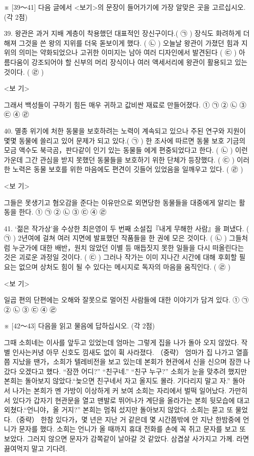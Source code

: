 \documentclass[12pt]{article}
\begin{document}
\begin{enumerate}[1.]
※ [39～41] 다음 글에서 <보기>의 문장이 들어가기에 가장 알맞은 곳을 고르십시오. (각 2점)

39.
  왕관은 과거 지배 계층이 착용했던 대표적인 장신구이다.( ㉠ ) 장식도
화려하게 더해져 그것을 쓴 왕의 지위를 더욱 돋보이게 했다. ( ㉡ )
오늘날 왕관이 가졌던 힘과 지위의 의미는 약화되었으나 고귀한 이미지는
남아 여러 디자인에서 발견된다 ( ㉢ ) 아름다움이 강조되어야 할 신부의
머리 장식이나 여러 액세서리에 왕관이 활용되고 있는 것이다. ( ㉣ )

<보 기>

그래서 백성들이 구하기 힘든 매우 귀하고 값비싼 재료로 만들어졌다.
① ㉠	② ㉡	③ ㉢	④ ㉣


40.
  멸종 위기에 처한 동물을 보호하려는 노력이 계속되고 있으나 주된 연구와
지원이 몇몇 동물에 쓸리고 있어 문제가 되고 있다.( ㉠ ) 한 조사에
따르면 동물 보호 기금의 모금 액수도 북극곰，판다같이 인기 있는 동물들
에게 편중되었다고 한다. ( ㉡ ) 이런 가운데 그간 관심을 받지 못했던
동물들을 보호하기 위한 단체가 등장했다. ( ㉢ ) 이러한 노력은 동물
보호를 위한 마음에도 편견이 깃들어 있었음을 일깨우고 있다. ( ㉣ )

<보 기>

그들은 못생기고 혐오감을 준다는 이유만으로 외면당한 동물들을 대중에게
알리는 활동을 한다.
① ㉠	② ㉡	③ ㉢	④ ㉣


41.
  ‘젊은 작가상’을 수상한 최은영이 두 번째 소설집『내게 무해한 사람』을
펴냈다. ( ㉠ ) 2년여에 걸쳐 여러 지면에 발표했던 작품들을 한 권에
모은 것이다. ( ㉡ ) 그들처럼 누군가에 대한 배반，원치 않았던 이별 등
매듭짓지 못한 일들을 다시 떠올린다는 것은 괴로운 과정일 것이다.
( ㉢ ) 그러나 작가는 이미 지나간 시간에 대해 후회할 필요는 없으며
상처도 힘이 될 수 있다는 메시지로 독자의 마음을 움직인다. ( ㉣ )

<보 기>

일곱 편의 단편에는 오해와 잘못으로 멀어진 사람들에 대한 이야기가
담겨 있다.
① ㉠	② ㉡	③ ㉢	④ ㉣




※ [42～43] 다음을 읽고 물음에 답하십시오. (각 2점)

  그때 소희네는 이사를 앞두고 있었는데 엄마는 그렇게 집을 나가 돌아
오지 않았다. 작별 인사는커녕 아무 신호도 낌새도 없이 휙 사라졌다. （중략）
엄마가 집 나가고 열흘쯤 지났을 땐가，소희가 텔레비전을 보고 있는데
본회가 현관에서 신을 신으며 잠깐 나갔다 오겠다고 했다.
  “잠깐 어디?” “친구네.” “친구 누구?” 소희가 눈을 맞추려 했지만 본희는
돌아보지 않았다.“늦으면 친구네서 자고 올지도 몰라. 기다리지 말고 자.”
돌아서 나가는 본희가 멘 가방이 이상하게 커 보여 소희는 자리에서 벌떡
일어났다. 가만히 서 있다가 갑자기 현관문을 열고 맨발로 뛰어나가 계단을
올라가는 본희 뒷모습에 대고 외쳤다.“언니야，올 거지?” 본희는 멈춰
섰지만 돌아보지 않았다. 소희는 묻고 또 물었다.（중략）
   한참 있다가，몇 년은 지난 거 같은데 몇 시간쯤밖에 안 지난 한밤중에
언니가 문자를 했다. 소희는 언니가 올 때까지 휴대 전화를 손에 꼭 쥐고
문자를 보고 또 보았다. 그러지 않으면 문자가 감쪽같이 날아갈 것 같았다.
   삼겹살 사가지고 가께. 라면 끓여먹지 말고 기다려.



\end{enumerate}
\end{document}
